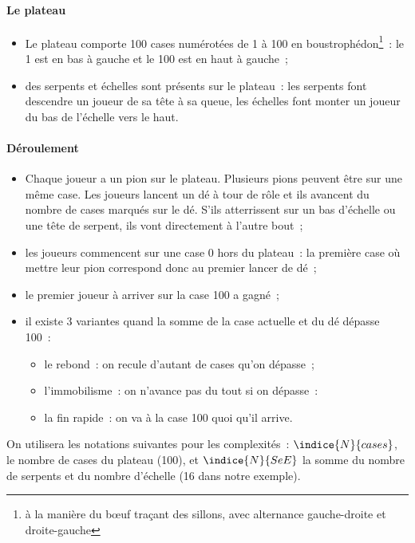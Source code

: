 \paragraph*{Le plateau}

\begin{itemize}
	\item Le plateau comporte 100 cases numérotées de 1 à 100 en boustrophédon\footnote{à la manière du bœuf traçant des sillons, avec alternance gauche-droite et droite-gauche}~: le 1 est en bas à gauche et le 100 est en haut à gauche~;
	\item des serpents et échelles sont présents sur le plateau~: les serpents font descendre un joueur de sa tête à sa queue, les échelles font monter un joueur du bas de l'échelle vers le haut.
\end{itemize}

\paragraph*{Déroulement}

\begin{itemize}
	\item Chaque joueur a un pion sur le plateau. Plusieurs pions peuvent être sur une même case. Les joueurs lancent un dé à tour de rôle et ils avancent du nombre de cases marqués sur le dé. S'ils atterrissent sur un bas d'échelle ou une tête de serpent, ils vont directement à l'autre bout~;
	\item les joueurs commencent sur une case 0 hors du plateau~: la première case où mettre leur pion correspond donc au premier lancer de dé~;
	\item le premier joueur à arriver sur la case 100 a gagné~; 
	\item il existe 3 variantes quand la somme de la case actuelle et du dé dépasse 100~:
	\begin{itemize}
		\item le rebond~: on recule d'autant de cases qu'on dépasse~;
		\item l'immobilisme~: on n'avance pas du tout si on dépasse~: 
		\item la fin rapide~: on va à la case 100 quoi qu'il arrive. 
	\end{itemize}
\end{itemize}

On utilisera les notations suivantes pour les complexités~: $\indice{N}{cases}$, le nombre de cases du plateau (100), et $\indice{N}{SeE}$ la somme du nombre de serpents et du nombre d'échelle (16 dans notre exemple).

